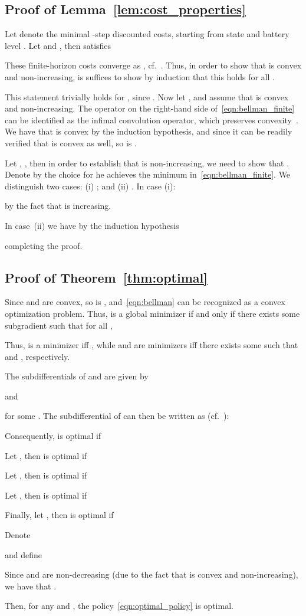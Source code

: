 \documentclass[journal]{IEEEtran}
\newcommand\1{\mathbf{1}}
\begin{document}
\subsection{Proof of Lemma~\ref{lem:cost_properties}}\label{sec:proof_lemma}
\begin{IEEEproof}
Let  denote the minimal -step discounted costs, starting from state  and battery level . Let  and , then  satisfies

These finite-horizon costs converge as , cf.~\cite[Proposition 4.4]{BS96}. Thus, in order to show that  is convex and non-increasing, is suffices to show by induction that this holds for all .

This statement trivially holds for , since . Now let , and assume that  is convex and non-increasing. The operator on the right-hand side of~\eqref{eqn:bellman_finite} can be identified as the infimal convolution operator, which preserves convexity~\cite[Theorem 5.4]{Rockafellar72}. We have that  is convex by the induction hypothesis, and since it can be readily verified that  is convex as well, so is .

Let , , then in order to establish that  is non-increasing, we need to show that . Denote by  the choice for  he achieves the minimum in~\eqref{eqn:bellman_finite}. We distinguish two cases: (i) ; and (ii) . In case (i):

by the fact that  is increasing.

In case~(ii) we have by the induction hypothesis

completing the proof.
\end{IEEEproof}

\subsection{Proof of Theorem~\ref{thm:optimal}}\label{sec:proof_theorem}
\begin{IEEEproof}
Since  and  are convex, so is , and~\eqref{eqn:bellman} can be recognized as a convex optimization problem. Thus,  is a global minimizer if and only if there exists some subgradient  such that for all ,

Thus,  is a minimizer iff , while  and  are minimizers iff there exists some  such that  and , respectively.

The subdifferentials of  and  are given by

and

for some . The subdifferential of  can then be written as (cf.~\cite[Theorem 23.8]{Rockafellar72}):

Consequently,  is optimal if

Let , then  is optimal if

Let , then  is optimal if

Let , then  is optimal if

Finally, let , then  is optimal if


Denote

and define

Since  and  are non-decreasing (due to the fact that  is convex and non-increasing), we have that .

Then, for any  and , the policy~\eqref{eqn:optimal_policy} is optimal.
\end{IEEEproof}
\end{document}
